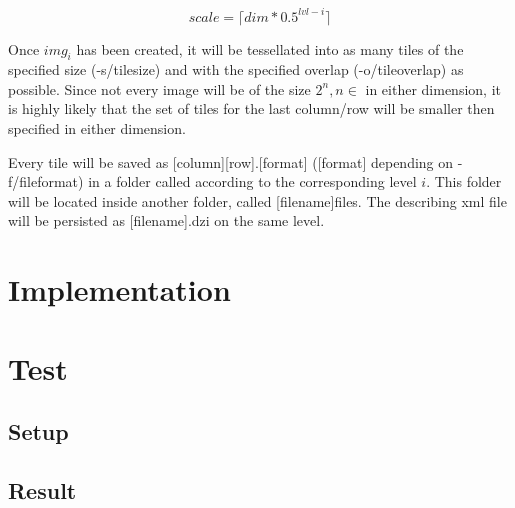 \begin{equation}
	scale = {\lceil}dim * 0.5^{lvl-i}\rceil
\end{equation}

Once $img_i$ has been created, it will be tessellated into as many tiles of the specified size (-s/tile{\textunderscore}size) and with the specified overlap (-o/tile{\textunderscore}overlap) as possible. Since not every image will be of the size $2^n, n \in $ in either dimension, it is highly likely that the set of tiles for the last column/row will be smaller then specified in either dimension.

Every tile will be saved as [column]{\textunderscore}[row].[format] ([format] depending on -f/file{\textunderscore}format) in a folder called according to the corresponding level $i$. This folder will be located inside another folder, called [filename]{\textunderscore}files. The describing xml file will be persisted as [filename].dzi on the same level.


\section{Implementation}
\section{Test}
\subsection{Setup}
\subsection{Result}